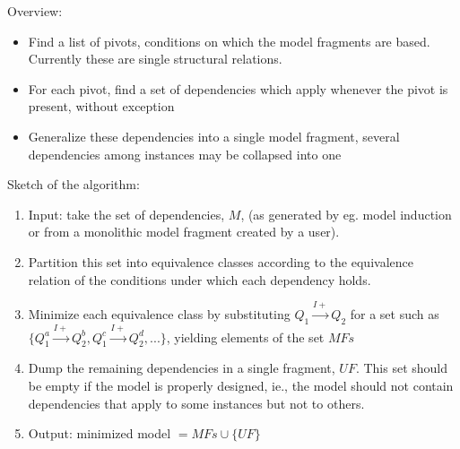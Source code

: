 \documentclass{article} %
\begin{document}
Overview:

\begin{itemize}

\item Find a list of pivots, conditions on which the model fragments are
	based. Currently these are single structural relations.

\item For each pivot, find a set of dependencies which apply whenever the
	pivot is present, without exception

\item Generalize these dependencies into a single model fragment, several
	dependencies among instances may be collapsed into one

\end{itemize}

%
%

Sketch of the algorithm:

\begin{enumerate}

\item Input: take the set of dependencies, $M$, (as generated by eg. model
	induction or from a monolithic model fragment created by a user).  

\item Partition this set into equivalence classes according to the
	equivalence relation of the conditions under which each dependency
	holds.

\item Minimize each equivalence class by substituting 
	$Q_1 \overset{I+}{\rightarrow} Q_2 $ for a set such as 
	$ \{ Q_1^a \overset{I+}{\rightarrow} Q_2^b, Q_1^c \overset{I+}{\rightarrow} Q_2^d,  . . . \} $, 
	yielding elements of the set $MFs$

\item Dump the remaining dependencies in a single fragment, $UF$. 
	This set should be empty if the model is properly designed, ie., the
	model should not contain dependencies that apply to some instances but
	not to others.

\item Output: minimized model $ = MFs \cup \{ UF \} $

\end{enumerate}
\end{document}
